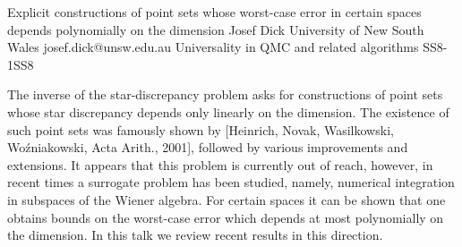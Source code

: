 \begin{talk}
  {Explicit constructions of point sets whose worst-case error in certain spaces depends polynomially on the dimension}%
  {Josef Dick}%
  {University of New South Wales}%
  {josef.dick@unsw.edu.au}%
  {}%
{Universality in QMC and related algorithms}
{}{SS8-1}{SS8}



The inverse of the star-discrepancy problem asks for constructions of point sets whose star discrepancy depends only linearly on the dimension. The existence of such point sets was famously shown by [Heinrich, Novak, Wasilkowski, Wo\'zniakowski, Acta Arith., 2001], followed by various improvements and extensions. It appears that this problem is currently out of reach, however, in recent times a surrogate problem has been studied, namely, numerical integration in subspaces of the Wiener algebra. For certain spaces it can be shown that one obtains bounds on the worst-case error which depends at most polynomially on the dimension. In this talk we review recent results in this direction.

\end{talk}

